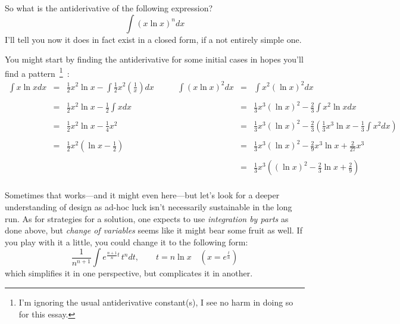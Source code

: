 \documentclass[twoside]{article}
\begin{document}
So what is the antiderivative of the following expression?
$$ \int (x\ln x)^n dx $$
I'll tell you now it does in fact exist in a closed form, if a not entirely simple one.

You might start by finding the antiderivative for some initial cases in hopes you'll find a pattern~\footnote{I'm
ignoring the usual antiderivative constant(s), I see no harm in doing so for this essay.}\ :
$$ \begin{array}{rcl|rcl}
\int x\ln x dx		& = & \frac{1}{2}x^2\ln x - \int\frac{1}{2}x^2(\frac{1}{x}) dx	\quad&\quad
\int (x\ln x)^2 dx	& = & \int x^2(\ln x)^2 dx									\\
&&&&&															\\
			& = & \frac{1}{2}x^2\ln x - \frac{1}{2}\int x dx		\quad&\quad
			& = & \frac{1}{3}x^3(\ln x)^2 - \frac{2}{3}\int x^2\ln x dx					\\
&&&&&															\\
			& = & \frac{1}{2}x^2\ln x - \frac{1}{4}x^2			\quad&\quad
			& = & \frac{1}{3}x^3(\ln x)^2 - \frac{2}{3}(\frac{1}{3}x^3\ln x - \frac{1}{3}\int x^2 dx)	\\
&&&&&															\\
			& = & \frac{1}{2}x^2(\ln x - \frac{1}{2})			\quad&\quad
			& = & \frac{1}{3}x^3(\ln x)^2 - \frac{2}{9}x^3\ln x + \frac{2}{27}x^3				\\
&&&&&															\\
			&   &								\quad&\quad
			& = & \frac{1}{3}x^3((\ln x)^2 - \frac{2}{3}\ln x + \frac{2}{9})				\\
\end{array} $$

Sometimes that works---and it might even here---but let's look for a deeper
understanding of design as ad-hoc luck isn't necessarily sustainable in the long run.
As for strategies for a solution, one expects to use \emph{integration by parts} as done above,
but \emph{change of variables} seems like it might bear some fruit as well. If you play with it a little,
you could change it to the following form:
$$ \frac{1}{n^{n+1}}\int e^{\frac{n+1}{n}t}\,t^n dt,\qquad t=n\ln x\quad(x=e^\frac{t}{n}) $$
which simplifies it in one perspective, but complicates it in another.
\end{document}

